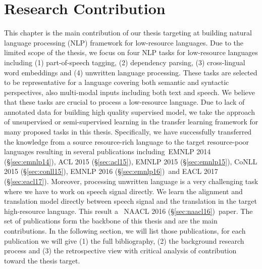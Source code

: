\documentclass[12pt,twoside,final,hidelinks]{ltthesis}
\theoremstyle{definition}
\newcommand\emnlpiv{EMNLP 2014 (\S\ref{sec:emnlp14})}
\newcommand\conllv{CoNLL 2015 (\S\ref{sec:conll15})}
\newcommand\aclv{ACL 2015 (\S\ref{sec:acl15})}
\newcommand\emnlpv{EMNLP 2015 (\S\ref{sec:emnlp15})}
\newcommand\naaclvi{NAACL 2016 (\S\ref{sec:naacl16})}
\newcommand\emnlpvi{EMNLP 2016 (\S\ref{sec:emnlp16})}
\newcommand\eaclvii{EACL 2017 (\S\ref{sec:eacl17})}
\begin{document}
\chapter{Research Contribution}
\label{chap:research_summary}
This chapter is the main contribution of our thesis targeting at building natural language processing (NLP) framework for low-resource languages. 
Due to the limited scope of the thesis, we focus on four NLP tasks 
for low-resource languages including (1) part-of-speech  tagging, (2) dependency parsing, (3) cross-lingual word embeddings and (4) unwritten 
language processing. These tasks are selected to be representative for a language covering both semantic and syntactic perspectives, also 
multi-modal inputs including both text and speech. We believe that these tasks are crucial to process a low-resource language.  
Due to lack of annotated data for building high quality supervised model, we take the approach of 
unsupervised or semi-supervised learning in the transfer learning framework for many proposed tasks in this thesis. Specifically, we have successfully transferred the knowledge from a source resource-rich language to the target resource-poor languages resulting in several publications including~\emnlpiv, \aclv, 
\emnlpv, \conllv, \emnlpvi\ and \eaclvii . Moreover, processing unwritten language is a very challenging task where we have to work on speech signal directly. We learn the alignment and translation model directly between speech signal and the translation in the target high-resource language. This  
result a ~\naaclvi\ paper.
The set of publications form the backbone of this thesis and are the main contributions. 
In the following section, we will list those publications, for each publication we will give (1) the full bibliography, (2) the background research process and (3) the retrospective view with critical analysis of contribution toward the thesis target. 

\end{document}
